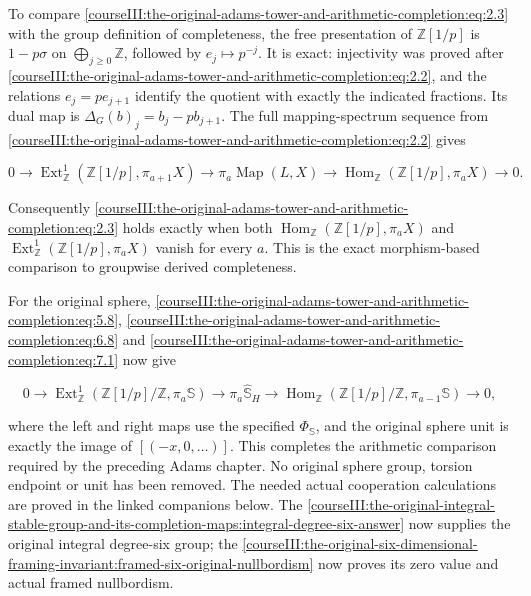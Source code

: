 To compare \eqref{courseIII:the-original-adams-tower-and-arithmetic-completion:eq:2.3} with the group definition of completeness, the free presentation of \(\mathbb Z[1/p]\) is \(1-p\sigma\) on \(\bigoplus_{j\geq0}\mathbb Z\), followed by \(e_j\mapsto p^{-j}\). It is exact: injectivity was proved after \eqref{courseIII:the-original-adams-tower-and-arithmetic-completion:eq:2.2}, and the relations \(e_j=pe_{j+1}\) identify the quotient with exactly the indicated fractions. Its dual map is
\(\Delta_G(b)_j=b_j-pb_{j+1}\). The full mapping-spectrum sequence from \eqref{courseIII:the-original-adams-tower-and-arithmetic-completion:eq:2.2} gives

\begin{equation}
0\longrightarrow\operatorname{Ext}^1_{\mathbb Z}(\mathbb Z[1/p],\pi_{a+1}X)
\longrightarrow\pi_a\operatorname{Map}(L,X)
\longrightarrow\operatorname{Hom}_{\mathbb Z}(\mathbb Z[1/p],\pi_aX)
\longrightarrow0.
\label{courseIII:the-original-adams-tower-and-arithmetic-completion:eq:7.8}
\end{equation}

Consequently \eqref{courseIII:the-original-adams-tower-and-arithmetic-completion:eq:2.3} holds exactly when both \(\operatorname{Hom}_{\mathbb Z}(\mathbb Z[1/p],\pi_aX)\) and \(\operatorname{Ext}^1_{\mathbb Z}(\mathbb Z[1/p],\pi_aX)\) vanish for every \(a\). This is the exact morphism-based comparison to groupwise derived completeness.

For the original sphere, \eqref{courseIII:the-original-adams-tower-and-arithmetic-completion:eq:5.8}, \eqref{courseIII:the-original-adams-tower-and-arithmetic-completion:eq:6.8} and \eqref{courseIII:the-original-adams-tower-and-arithmetic-completion:eq:7.1} now give

\begin{equation}
0\longrightarrow
\operatorname{Ext}^1_{\mathbb Z}(\mathbb Z[1/p]/\mathbb Z,\pi_a\mathbb S)
\longrightarrow\pi_a\widehat{\mathbb S}_H
\longrightarrow
\operatorname{Hom}_{\mathbb Z}(\mathbb Z[1/p]/\mathbb Z,\pi_{a-1}\mathbb S)
\longrightarrow0,
\label{courseIII:the-original-adams-tower-and-arithmetic-completion:eq:7.9}
\end{equation}

where the left and right maps use the specified \(\Phi_{\mathbb S}\), and the original sphere unit is exactly the image of \([(-x,0,\ldots)]\). This completes the arithmetic comparison required by the preceding Adams chapter. No original sphere group, torsion endpoint or unit has been removed. The needed actual cooperation calculations are proved in the linked companions below. The \cref{courseIII:the-original-integral-stable-group-and-its-completion-maps:integral-degree-six-answer} now supplies the original integral degree-six group; the \cref{courseIII:the-original-six-dimensional-framing-invariant:framed-six-original-nullbordism} now proves its zero value and actual framed nullbordism.

